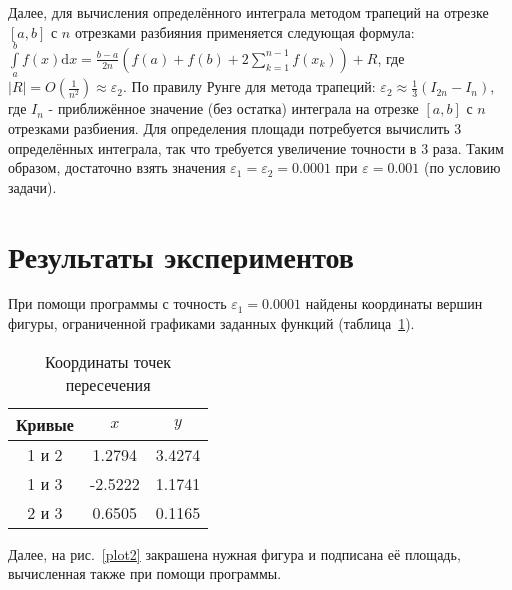 \documentclass[a4paper,12pt,titlepage,finall]{article}
\begin{document}
Далее, для вычисления определённого интеграла методом трапеций на отрезке $[a,b]$ с $n$ отрезками разбияния применяется следующая формула: $\int \limits_a^b f(x) \mathrm{d}x = \frac{b-a}{2n} \left( f(a)+f(b)+2\sum \limits_{k=1}^{n-1}f(x_k) \right) + R$, где $|R| = O(\frac{1}{n^2}) \approx \varepsilon_2$. По правилу Рунге для метода трапеций: $\varepsilon_2 \approx \frac{1}{3}(I_{2n} - I_n)$, где $I_n$ - приближённое значение (без остатка) интеграла на отрезке $[a,b]$ с $n$ отрезками разбиения. Для определения площади потребуется вычислить 3 определённых интеграла, так что требуется увеличение точности в 3 раза. Таким образом, достаточно взять значения $\varepsilon_1 = \varepsilon_2 = 0.0001$ при $\varepsilon = 0.001$ (по условию задачи).

\newpage

\section{Результаты экспериментов}

При помощи программы с точность $\varepsilon_1=0.0001$ найдены координаты вершин фигуры, ограниченной графиками заданных функций (таблица~\ref{table1}).

\begin{table}[h]
\centering
\begin{tabular}{|c|c|c|}
\hline
Кривые & $x$ & $y$ \\
\hline
1 и 2 & 1.2794 & 3.4274 \\
1 и 3 & -2.5222 & 1.1741 \\
2 и 3 & 0.6505 & 0.1165 \\
\hline
\end{tabular}
\caption{Координаты точек пересечения}
\label{table1}
\end{table}

Далее, на рис.~\ref{plot2} закрашена нужная фигура и подписана её площадь, вычисленная также при помощи программы.
\end{document}

